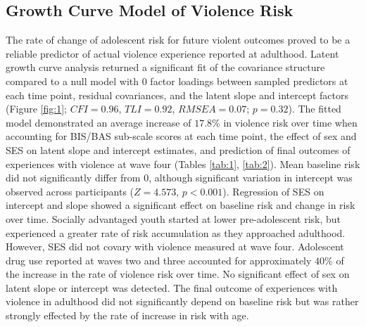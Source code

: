 \documentclass[utf8]{article}
\begin{document}
\subsection*{Growth Curve Model of Violence Risk} The rate of change of adolescent risk for future violent outcomes proved to be a reliable predictor of actual violence experience reported at adulthood. Latent growth curve analysis returned a significant fit of the covariance structure compared to a null model with 0 factor loadings between sampled predictors at each time point, residual covariances, and the latent slope and intercept factors (Figure \ref{fig:1}; $CFI = 0.96$, $TLI = 0.92$, $RMSEA = 0.07$; $p = 0.32$). The fitted model demonstrated an average increase of $17.8\%$ in violence risk over time when accounting for BIS/BAS sub-scale scores at each time point, the effect of sex and SES on latent slope and intercept estimates, and prediction of final outcomes of experiences with violence at wave four (Tables \ref{tab:1}, \ref{tab:2}). Mean baseline risk did not significantly differ from $0$, although significant variation in intercept was observed across participants ($Z=4.573$, $p<0.001$). Regression of SES on intercept and slope showed a significant effect on baseline risk and change in risk over time. Socially advantaged youth started at lower pre-adolescent risk, but experienced a greater rate of risk accumulation as they approached adulthood. However, SES did not covary with violence measured at wave four. Adolescent drug use reported at waves two and three accounted for approximately $40\%$ of the increase in the rate of violence risk over time. No significant effect of sex on latent slope or intercept was detected. The final outcome of experiences with violence in adulthood did not significantly depend on baseline risk but was rather strongly effected by the rate of increase in risk with age. 
\end{document}
